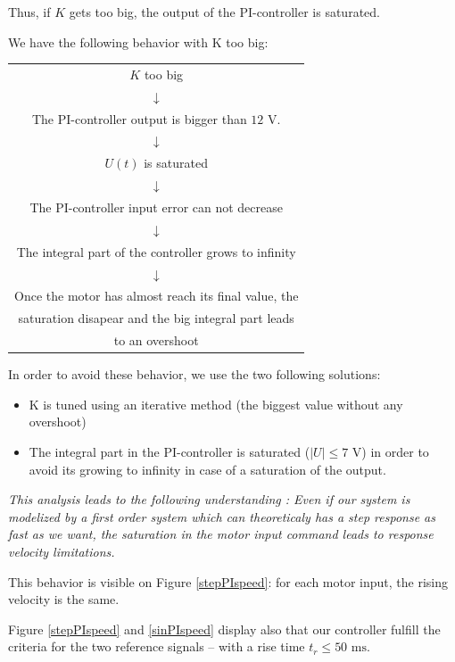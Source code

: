 Thus, if $K$ gets too big, the output of the PI-controller is saturated. 

We have the following behavior with K too big:

\begin{center}
\begin{tabular}{c}
  $K$ too big \\ 
  $\downarrow$ \\ The PI-controller output is bigger than $12$ V. \\
  $\downarrow$ \\ $U(t)$ is saturated \\
  $\downarrow$ \\ The PI-controller input error can not decrease \\
  $\downarrow$ \\ The integral part of the controller grows to infinity \\
  $\downarrow$ \\ Once the motor has almost reach its final value, the \\saturation disapear and the big integral part leads\\ to an overshoot
\end{tabular}
\end{center}

In order to avoid these behavior, we use the two following solutions:
\begin{itemize}
 \item K is tuned using an iterative method (the biggest value without any overshoot)
 \item The integral part in the PI-controller is saturated ($|U| \leq 7 \text{ V}$) in order to avoid its growing to infinity in case of a saturation of the output.
\end{itemize}

\emph{This analysis leads to the following understanding : 
Even if our system is modelized by a first order system which can theoreticaly has a step response as fast as we want, 
the saturation in the motor input command leads to response velocity limitations.} \ \newline

This behavior is visible on Figure \ref{stepPIspeed}: for each motor input, the rising velocity is the same. 

Figure \ref{stepPIspeed} and \ref{sinPIspeed} display also that our controller fulfill the criteria for the two reference signals -- with a rise time $t_r \leq 50 \text{ ms}$.

